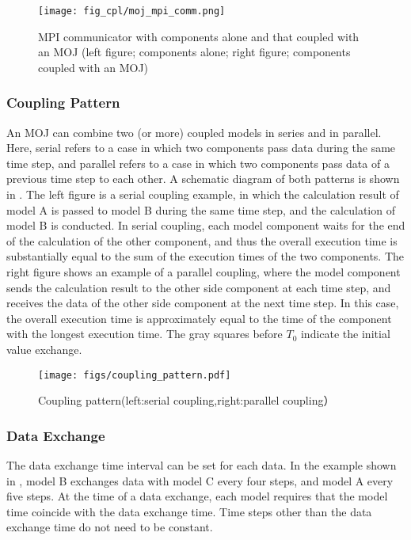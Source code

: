 \begin{figure}
\hypertarget{fig:moj_mpi_comm}{%
\centering
\texttt{[image: fig\_cpl/moj\_mpi\_comm.png]}
\caption{MPI communicator with components alone and that coupled with an
MOJ (left figure; components alone; right figure; components coupled
with an MOJ)}\label{fig:moj_mpi_comm}
}
\end{figure}

\hypertarget{coupling-pattern}{%
\subsubsection{Coupling Pattern}\label{coupling-pattern}}

An MOJ can combine two (or more) coupled models in series and in
parallel. Here, serial refers to a case in which two components pass
data during the same time step, and parallel refers to a case in which
two components pass data of a previous time step to each other. A
schematic diagram of both patterns is shown in . The left figure is a
serial coupling example, in which the calculation result of model A is
passed to model B during the same time step, and the calculation of
model B is conducted. In serial coupling, each model component waits for
the end of the calculation of the other component, and thus the overall
execution time is substantially equal to the sum of the execution times
of the two components. The right figure shows an example of a parallel
coupling, where the model component sends the calculation result to the
other side component at each time step, and receives the data of the
other side component at the next time step. In this case, the overall
execution time is approximately equal to the time of the component with
the longest execution time. The gray squares before \(T_0\) indicate the
initial value exchange.

\begin{figure}
\hypertarget{fig:coupling_pattern}{%
\centering
\texttt{[image: figs/coupling\_pattern.pdf]}
\caption{Coupling pattern(left:serial coupling,right:parallel
coupling）}\label{fig:coupling_pattern}
}
\end{figure}

\hypertarget{data-exchange}{%
\subsubsection{Data Exchange}\label{data-exchange}}

The data exchange time interval can be set for each data. In the example
shown in , model B exchanges data with model C every four steps, and
model A every five steps. At the time of a data exchange, each model
requires that the model time coincide with the data exchange time. Time
steps other than the data exchange time do not need to be constant.

